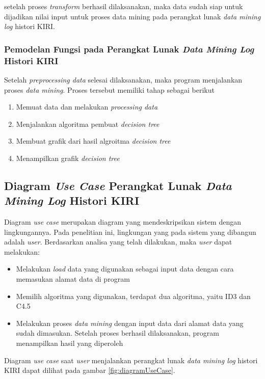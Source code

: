 setelah proses \textsl{transform} berhasil dilaksanakan, maka data sudah siap untuk dijadikan nilai input untuk proses data mining pada perangkat lunak \textsl{data mining log} histori KIRI.

\subsubsection{Pemodelan Fungsi pada Perangkat Lunak \textsl{Data Mining Log} Histori KIRI}
Setelah \textsl{preprocessing data} selesai dilaksanakan, maka program menjalankan proses \textsl{data mining}. Proses tersebut memiliki tahap sebagai berikut
\begin{enumerate}
	\item Memuat data dan melakukan \textsl{processing data}
	\item Menjalankan algoritma pembuat \textsl{decision tree} 
	\item Membuat grafik dari hasil algroitma \textsl{decision tree}
	\item Menampilkan grafik \textsl{decision tree}
\end{enumerate}  

\subsection{Diagram \textsl{Use Case} Perangkat Lunak \textsl{Data Mining Log} Histori KIRI}

Diagram \textsl{use case} merupakan diagram yang mendeskripsikan sistem dengan lingkungannya. Pada penelitian ini, lingkungan yang pada sistem yang dibangun adalah \textsl{user}. Berdasarkan analisa yang telah dilakukan, maka \textsl{user} dapat melakukan:
\begin{itemize}
	\item Melakukan \textsl{load} data yang digunakan sebagai input data dengan cara memasukan alamat data di program
	\item Memilih algoritma yang digunakan, terdapat dua algoritma, yaitu ID3 dan C4.5
	\item Melakukan proses \textsl{data mining} dengan input data dari alamat data yang sudah dimasukan. Setelah proses berhasil dilaksanakan, program menampilkan hasil yang diperoleh
\end{itemize}

Diagram \textsl{use case} saat \textsl{user} menjalankan perangkat lunak \textsl{data mining log} histori KIRI dapat dilihat pada gambar \ref{fig:diagramUseCase}.

